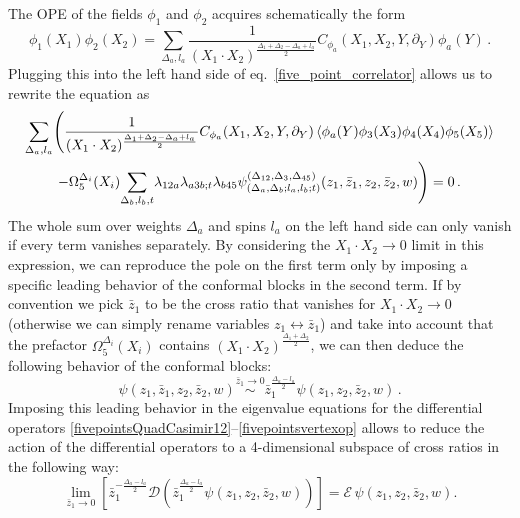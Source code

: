 \documentclass{article}
\begin{document}
The OPE of the fields  $\phi_1$ and $\phi_2$ acquires schematically the form
\begin{equation}
    \phi_1(X_1)\phi_2(X_2)=\sum_{\Delta_a,l_a} \frac{1}{(X_1\cdot X_2)^{\frac{\Delta_1+\Delta_2-\Delta_a+l_a}{2}}}C_{\phi_a}(X_1,X_2,Y,\partial_Y)\phi_a(Y)\,. 
    \label{OPEphi1phi2}
\end{equation}
Plugging this into the left hand side of eq.\ \eqref{five_point_correlator} 
allows us to rewrite the equation as
\begin{multline}
    \sum_{\Delta_a,l_a} \Biggl(\frac{1}{(X_1\cdot X_2)^{\frac{\Delta_1+\Delta_2-\Delta_a+l_a}{2}}}C_{\phi_a}(X_1,X_2,Y,\partial_Y)\expval{\phi_a(Y)\phi_3(X_3)\phi_4(X_4)\phi_5(X_5)}\\
    - \Omega_5^{\Delta_i}(X_i)\!\sum_{\Delta_b,l_b,t}\! \lambda_{12a}\lambda_{a 3 b;t}\lambda_{b45} \psi^{(\Delta_{12},\Delta_3,\Delta_{45})}_{(\Delta_a,\Delta_b;l_a,l_b;t)}(z_1,\bar{z}_1,z_2,\bar{z}_2,w) \Biggr)=0\,. 
    \label{five_point_to_four_point}
\end{multline}
The whole sum over weights $\Delta_a$ and spins $l_a$ on the left hand side can only vanish if 
every term vanishes separately. By considering the $X_1\cdot X_2\rightarrow 0$ limit in this 
expression, we can reproduce the pole on the first term only by imposing a specific leading 
behavior of the conformal blocks in the second term. If by convention we pick $\bar{z}_1$ to 
be the cross ratio that vanishes for $X_1\cdot X_2\rightarrow 0$ (otherwise we can simply 
rename variables $z_1\leftrightarrow \bar{z}_1$) and take into account that the prefactor 
$\Omega_5^{\Delta_i}(X_i)$ contains $(X_1\cdot X_2)^{\frac{\Delta_1+\Delta_2}{2}}$, we can 
then deduce the following behavior of the conformal blocks:
\begin{equation}
    \psi(z_1,\bar{z}_1,z_2,\bar{z}_2,w)\stackrel{\bar{z}_1\rightarrow 0}{\sim}\bar{z}_1^{\frac{\Delta_a-l_a}{2}} \psi(z_1,z_2,\bar{z}_2,w)\,.
\end{equation}
Imposing this leading behavior in the eigenvalue equations for the differential operators \eqref{fivepointsQuadCasimir12}--\eqref{fivepointsvertexop} allows to reduce the action of 
the differential operators to a 4-dimensional subspace of cross ratios in the following way:
\begin{equation}
    \lim_{\bar{z}_1\rightarrow 0}\left[\bar{z}_1^{-\frac{\Delta_a-l_a}{2}}\mathcal{D}\left( \bar{z}_1^{\frac{\Delta_a-l_a}{2}} \psi(z_1,z_2,\bar{z}_2,w)\right)\right]=\mathcal{E}\,\psi(z_1,z_2,\bar{z}_2,w).
\end{equation}
\end{document}
